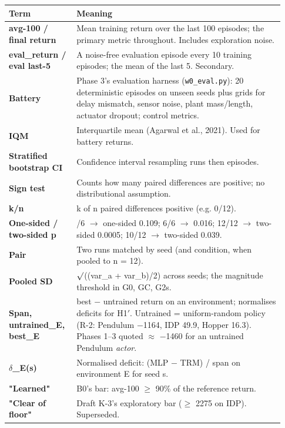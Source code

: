 \documentclass[11pt]{article}
\begin{document}
\begin{center}\small\begin{tabular}{>{\raggedright\arraybackslash}p{0.217\linewidth}>{\raggedright\arraybackslash}p{0.717\linewidth}}
\toprule
Term & Meaning \\
\midrule
\textbf{avg-100 / final return} & Mean training return over the last 100 episodes; the primary metric throughout. Includes exploration noise. \\
\textbf{eval\_return / eval last-5} & A noise-free evaluation episode every 10 training episodes; the mean of the last 5. Secondary. \\
\textbf{Battery} & Phase 3's evaluation harness (\texttt{w0\_eval.py}): 20 deterministic episodes on unseen seeds plus grids for delay mismatch, sensor noise, plant mass/length, actuator dropout; control metrics. \\
\textbf{IQM} & Interquartile mean (Agarwal et al., 2021). Used for battery returns. \\
\textbf{Stratified bootstrap CI} & Confidence interval resampling runs then episodes. \\
\textbf{Sign test} & Counts how many paired differences are positive; no distributional assumption. \\
\textbf{k/n} & k of n paired differences positive (e.g. 0/12). \\
\textbf{One-sided / two-sided p} & 5/6 $\rightarrow$ one-sided 0.109; 6/6 $\rightarrow$ 0.016; 12/12 $\rightarrow$ two-sided 0.0005; 10/12 $\rightarrow$ two-sided 0.039. \\
\textbf{Pair} & Two runs matched by seed (and condition, when pooled to n = 12). \\
\textbf{Pooled SD} & $\surd$((var\_a + var\_b)/2) across seeds; the magnitude threshold in G0, GC, G2s. \\
\textbf{Span, untrained\_E, best\_E} & best $-$ untrained return on an environment; normalises deficits for H1$'$. Untrained = uniform-random policy (R-2: Pendulum $-$1164, IDP 49.9, Hopper 16.3). Phases 1--3 quoted $\approx$ $-$1460 for an untrained Pendulum \emph{actor}. \\
\textbf{$\delta$\_E(s)} & Normalised deficit: (MLP $-$ TRM) / span on environment E for seed s. \\
\textbf{"Learned"} & B0's bar: avg-100 $\geq$ 90\% of the reference return. \\
\textbf{"Clear of floor"} & Draft K-3's exploratory bar ($\geq$ 2275 on IDP). Superseded. \\

\end{tabular}
\end{center}
\end{document}
